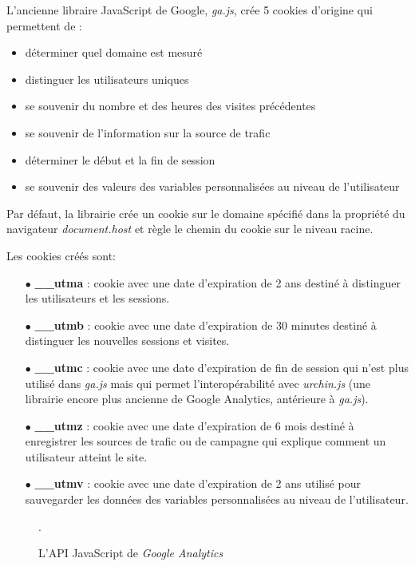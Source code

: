L'ancienne libraire JavaScript de Google, \textit{ga.js}, crée 5 cookies d'origine qui permettent de :
\begin{itemize}
  \item déterminer quel domaine est mesuré
  \item distinguer les utilisateurs uniques
  \item se souvenir du nombre et des heures des visites précédentes
  \item se souvenir de l'information sur la source de trafic
  \item déterminer le début et la fin de session
  \item se souvenir des valeurs des variables personnalisées au niveau de l'utilisateur
\end{itemize}

Par défaut, la librairie crée un cookie sur le domaine spécifié dans la propriété du navigateur \textit{document.host} et règle le chemin du cookie sur le niveau racine.

Les cookies créés sont:
\begin{itemize}
  \item[$\bullet$] \textbf{\_\_utma} : cookie avec une date d'expiration de 2 ans destiné à distinguer les utilisateurs et les sessions.
  \item[$\bullet$] \textbf{\_\_utmb} : cookie avec une date d'expiration de 30 minutes destiné à distinguer les nouvelles sessions et visites.
  \item[$\bullet$] \textbf{\_\_utmc} : cookie avec une date d'expiration de fin de session qui n'est plus utilisé dans \textit{ga.js} mais qui permet l'interopérabilité avec \textit{urchin.js} (une librairie encore plus ancienne de Google Analytics, antérieure à \textit{ga.js}).
  \item[$\bullet$] \textbf{\_\_utmz} : cookie avec une date d'expiration de 6 mois destiné à enregistrer les sources de trafic ou de campagne qui explique comment un utilisateur atteint le site.
  \item[$\bullet$] \textbf{\_\_utmv} : cookie avec une date d'expiration de 2 ans utilisé pour sauvegarder les données des variables personnalisées au niveau de l'utilisateur.
\end{itemize}

\begin{figure}[h]
	\centering
	
	\caption{\label{js_google_analytics}L'API JavaScript de \textit{Google Analytics}}.
\end{figure}

